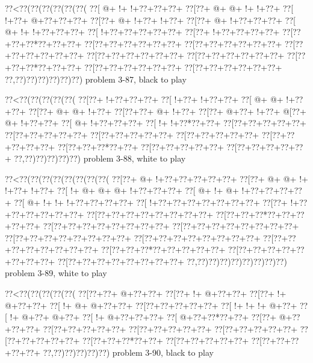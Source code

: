 \vbox{\vbox{\goo
\0??<\0??(\0??(\0??(\0??(\0??(\0??(
\0??[\- @+\- !+\- !+\0??+\0??+\0??+
\0??[\0??+\- @+\- @+\- !+\- !+\0??+
\0??[\- !+\0??+\- @+\0??+\0??+\0??+
\0??[\0??+\- @+\- !+\0??+\- !+\0??+
\0??[\0??+\- @+\- !+\0??+\0??+\0??+
\0??[\- @+\- !+\- !+\0??+\0??+\0??+
\0??[\- !+\0??+\0??+\0??+\0??+\0??+
\0??[\0??+\- !+\0??+\0??+\0??+\0??+
\0??[\0??+\0??+\0??*\0??+\0??+\0??+
\0??[\0??+\0??+\0??+\0??+\0??+\0??+
\0??[\0??+\0??+\0??+\0??+\0??+\0??+
\0??[\0??+\0??+\0??+\0??+\0??+\0??+
\0??[\0??+\0??+\0??+\0??+\0??+\0??+
\0??[\0??+\0??+\0??+\0??+\0??+\0??+
\0??[\0??+\0??+\0??*\0??+\0??+\0??+
\0??[\0??+\0??+\0??+\0??+\0??+\0??+
\0??[\0??+\0??+\0??+\0??+\0??+\0??+
\0??,\0??)\0??)\0??)\0??)\0??)\0??)
}
\hfil problem 3-87, black to play\hfil\break
}

\vbox{\vbox{\goo
\0??<\0??(\0??(\0??(\0??(\0??(
\0??[\0??+\- !+\0??+\0??+\0??+
\0??[\- !+\0??+\- !+\0??+\0??+
\0??[\- @+\- @+\- !+\0??+\0??+
\0??[\0??+\- @+\- @+\- !+\0??+
\0??[\0??+\0??+\- @+\- !+\0??+
\0??[\0??+\- @+\0??+\- !+\0??+
\- @[\0??+\- @+\- !+\0??+\0??+
\0??[\- @+\- !+\0??+\0??+\0??+
\0??[\- !+\- !+\0??*\0??+\0??+
\0??[\0??+\0??+\0??+\0??+\0??+
\0??[\0??+\0??+\0??+\0??+\0??+
\0??[\0??+\0??+\0??+\0??+\0??+
\0??[\0??+\0??+\0??+\0??+\0??+
\0??[\0??+\0??+\0??+\0??+\0??+
\0??[\0??+\0??+\0??*\0??+\0??+
\0??[\0??+\0??+\0??+\0??+\0??+
\0??[\0??+\0??+\0??+\0??+\0??+
\0??,\0??)\0??)\0??)\0??)\0??)
}
\hfil problem 3-88, white to play\hfil\break
}

\vbox{\vbox{\goo
\0??<\0??(\0??(\0??(\0??(\0??(\0??(\0??(\0??(
\0??[\0??+\- @+\- !+\0??+\0??+\0??+\0??+\0??+
\0??[\0??+\- @+\- @+\- !+\- !+\0??+\- !+\0??+
\0??[\- !+\- @+\- @+\- @+\- !+\0??+\0??+\0??+
\0??[\- @+\- !+\- @+\- !+\0??+\0??+\0??+\0??+
\0??[\- @+\- !+\- !+\- !+\0??+\0??+\0??+\0??+
\0??[\- !+\0??+\0??+\0??+\0??+\0??+\0??+\0??+
\0??[\0??+\- !+\0??+\0??+\0??+\0??+\0??+\0??+
\0??[\0??+\0??+\0??+\0??+\0??+\0??+\0??+\0??+
\0??[\0??+\0??+\0??*\0??+\0??+\0??+\0??+\0??+
\0??[\0??+\0??+\0??+\0??+\0??+\0??+\0??+\0??+
\0??[\0??+\0??+\0??+\0??+\0??+\0??+\0??+\0??+
\0??[\0??+\0??+\0??+\0??+\0??+\0??+\0??+\0??+
\0??[\0??+\0??+\0??+\0??+\0??+\0??+\0??+\0??+
\0??[\0??+\0??+\0??+\0??+\0??+\0??+\0??+\0??+
\0??[\0??+\0??+\0??*\0??+\0??+\0??+\0??+\0??+
\0??[\0??+\0??+\0??+\0??+\0??+\0??+\0??+\0??+
\0??[\0??+\0??+\0??+\0??+\0??+\0??+\0??+\0??+
\0??,\0??)\0??)\0??)\0??)\0??)\0??)\0??)\0??)
}
\hfil problem 3-89, white to play\hfil\break
}

\vbox{\vbox{\goo
\0??<\0??(\0??(\0??(\0??(\0??(
\0??[\0??+\0??+\- @+\0??+\0??+
\0??[\0??+\- !+\- @+\0??+\0??+
\0??[\0??+\- !+\- @+\0??+\0??+
\0??[\- !+\- @+\- @+\0??+\0??+
\0??[\0??+\0??+\0??+\0??+\0??+
\0??[\- !+\- !+\- !+\- @+\0??+
\0??[\- !+\- @+\0??+\- @+\0??+
\0??[\- !+\- @+\0??+\0??+\0??+
\0??[\- @+\0??+\0??*\0??+\0??+
\0??[\0??+\- @+\0??+\0??+\0??+
\0??[\0??+\0??+\0??+\0??+\0??+
\0??[\0??+\0??+\0??+\0??+\0??+
\0??[\0??+\0??+\0??+\0??+\0??+
\0??[\0??+\0??+\0??+\0??+\0??+
\0??[\0??+\0??+\0??*\0??+\0??+
\0??[\0??+\0??+\0??+\0??+\0??+
\0??[\0??+\0??+\0??+\0??+\0??+
\0??,\0??)\0??)\0??)\0??)\0??)
}
\hfil problem 3-90, black to play\hfil\break
}

